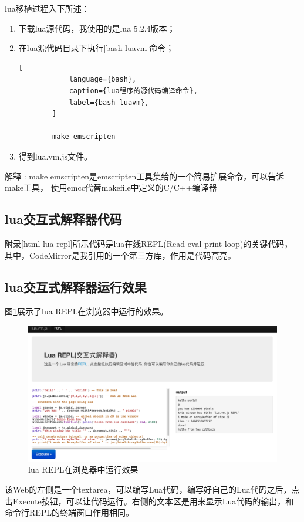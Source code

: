 lua移植过程入下所述：

\begin{enumerate}[itemindent=2em]
    \item 下载lua源代码，我使用的是lua 5.2.4版本；
    \item 在lua源代码目录下执行\ref{bash-luavm}命令；
        \begin{lstlisting}[
    		language={bash},
    		caption={lua程序的源代码编译命令},
    		label={bash-luavm},
		]

		make emscripten
		\end{lstlisting}
	\item 得到lua.vm.js文件。
\end{enumerate}

{\heiti 解释 : } make emscripten是emscripten工具集给的一个简易扩展命令，可以告诉make工具，
使用emcc代替makefile中定义的C/C++编译器

\subsection{lua交互式解释器代码}

附录\ref{html-lua-repl}所示代码是lua在线REPL(Read eval print loop)的关键代码，其中，CodeMirror是我引用的一个第三方库，作用是代码高亮。

\subsection{lua交互式解释器运行效果}

图\ref{lua-vm-repl}展示了lua REPL在浏览器中运行的效果。

\begin{figure}[h!] %
    \centering
    \includegraphics[width=400bp]{figure/pic/lua-vm-repl.png}
    \caption{lua REPL在浏览器中运行效果}
    \label{lua-vm-repl}
\end{figure}

该Web的左侧是一个textarea，可以编写Lua代码，编写好自己的Lua代码之后，点击Execute按钮，可以让代码运行。右侧的文本区是用来显示Lua代码的输出，和命令行REPL的终端窗口作用相同。